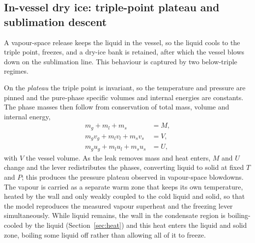 \documentclass[5p,authoryear]{elsarticle}
\begin{document}
\subsection{In-vessel dry ice: triple-point plateau and sublimation descent}
\label{sec:dryice}

A vapour-space release keeps the liquid in the vessel, so the liquid cools to the triple point,
freezes, and a dry-ice bank is retained, after which the vessel blows down on the sublimation line.
This behaviour is captured by two below-triple regimes.

On the \emph{plateau} the triple point is invariant, so the temperature and pressure are pinned and
the pure-phase specific volumes and internal energies are constants. The phase masses then follow
from conservation of total mass, volume and internal energy,
\begin{equation}
\label{eq:plateau}
\begin{aligned}
m_g + m_l + m_s &= M, \\
m_g v_g + m_l v_l + m_s v_s &= V, \\
m_g u_g + m_l u_l + m_s u_s &= U,
\end{aligned}
\end{equation}
with $V$ the vessel volume. As the leak removes mass and heat enters, $M$ and $U$ change and the
lever redistributes the phases, converting liquid to solid at fixed $T$ and $P$; this produces the
pressure plateau observed in vapour-space blowdowns. The vapour is carried as a separate warm zone
that keeps its own temperature, heated by the wall and only weakly coupled to the cold liquid and
solid, so that the model reproduces the measured vapour superheat and the freezing lever
simultaneously. While liquid remains, the wall in the condensate region is boiling-cooled by the
liquid (Section~\ref{sec:heat}) and this heat enters the liquid and solid zone, boiling some liquid
off rather than allowing all of it to freeze.
\end{document}
